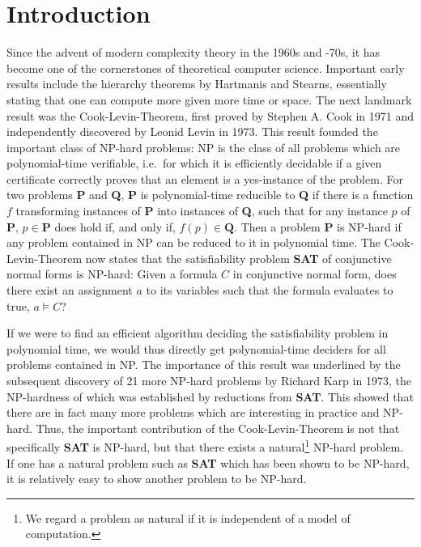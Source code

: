 \chapter{Introduction}
\newcommand{\SAT}{\textbf{SAT}}
\newcommand{\Clique}{\textbf{Clique}}

Since the advent of modern complexity theory in the 1960s and -70s, it has become one of the cornerstones of theoretical computer science. 
Important early results include the hierarchy theorems by Hartmanis and Stearns\cite{hartmanis_stearns}, essentially stating that one can compute more given more time or space. 
The next landmark result was the Cook-Levin-Theorem, first proved by Stephen A. Cook in 1971\cite{cook} and independently discovered by Leonid Levin in 1973\cite{levin}. 
This result founded the important class of NP-hard problems: NP is the class of all problems which are polynomial-time verifiable, i.e.\ for which it is efficiently decidable if a given certificate correctly proves that an element is a yes-instance of the problem. For two problems \textbf{P} and \textbf{Q}, \textbf{P} is polynomial-time reducible to \textbf{Q} if there is a function $f$ transforming instances of \textbf{P} into instances of \textbf{Q}, such that for any instance $p$ of \textbf{P}, $p \in \textbf{P}$ does hold if, and only if, $f(p) \in \textbf{Q}$. 
Then a problem \textbf{P} is NP-hard if any problem contained in NP can be reduced to it in polynomial time. 
The Cook-Levin-Theorem now states that the satisfiability problem \SAT{} of conjunctive normal forms is NP-hard: Given a formula $C$ in conjunctive normal form, does there exist an assignment $a$ to its variables such that the formula evaluates to \textsf{true}, $a \models C$?

If we were to find an efficient algorithm deciding the satisfiability problem in polynomial time, we would thus directly get polynomial-time deciders for all problems contained in NP. 
The importance of this result was underlined by the subsequent discovery of 21 more NP-hard problems by Richard Karp in 1973\cite{karp}, the NP-hardness of which was established by reductions from \textbf{SAT}. This showed that there are in fact many more problems which are interesting in practice and NP-hard. 
Thus, the important contribution of the Cook-Levin-Theorem is not that specifically \SAT{} is NP-hard, but that there exists a natural\footnote{We regard a problem as natural if it is independent of a model of computation.} NP-hard problem. If one has a natural problem such as \SAT{} which has been shown to be NP-hard, it is relatively easy to show another problem to be NP-hard.


